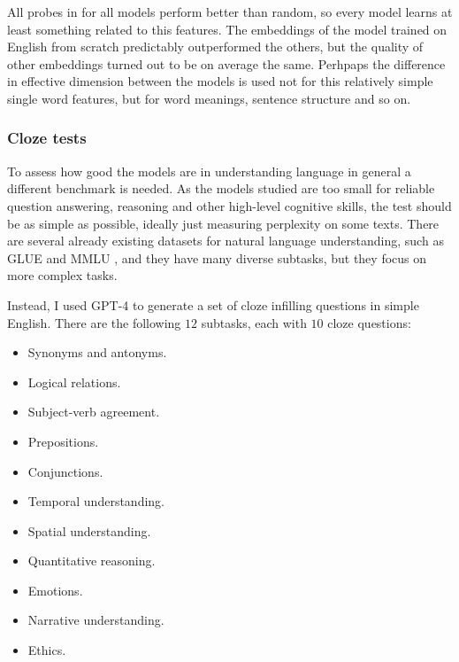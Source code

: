 \documentclass[a4paper, 11pt, oneside]{article}
\begin{document}
	All probes in for all models perform better than random, so every model learns
	at least something related to this features. The embeddings of the model trained
	on English from scratch predictably outperformed the others, but the quality
	of other embeddings turned out to be on average the same. Perhpaps the difference
	in effective dimension between the models is used not for this relatively simple
	single word features, but for word meanings, sentence structure and so on.

	\subsubsection{Cloze tests}

	To assess how good the models are in understanding language in general a
	different benchmark is needed. As the models studied are too small for reliable
	question answering, reasoning and other high-level cognitive skills, the test should
	be as simple as possible, ideally just measuring perplexity on some texts. There
	are several already existing datasets for natural language understanding, such
	as GLUE \cite{wang2018glue} and MMLU \cite{hendrycks2020measuring}, and they have
	many diverse subtasks, but they focus on more complex tasks.

	Instead, I used GPT-4 \cite{openai2023gpt4} to generate a set of cloze infilling
	questions in simple English. There are the following $12$ subtasks, each with $1
	0$ cloze questions:
	\begin{itemize}
		\item Synonyms and antonyms.

		\item Logical relations.

		\item Subject-verb agreement.

		\item Prepositions.

		\item Conjunctions.

		\item Temporal understanding.

		\item Spatial understanding.

		\item Quantitative reasoning.

		\item Emotions.

		\item Narrative understanding.

		\item Ethics.
	\end{itemize}
\end{document}
